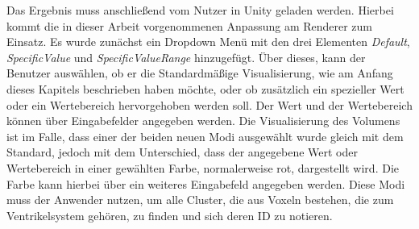 Das Ergebnis muss anschließend vom Nutzer in Unity geladen werden.
\newline
Hierbei kommt die in dieser Arbeit vorgenommenen Anpassung am Renderer zum Einsatz. Es wurde zunächst ein Dropdown Menü mit den drei Elementen \textit{Default}, \textit{SpecificValue} und \textit{SpecificValueRange} hinzugefügt. Über dieses, kann der Benutzer auswählen, ob er die Standardmäßige Visualisierung, wie am Anfang dieses Kapitels beschrieben haben möchte, oder ob zusätzlich ein spezieller Wert oder ein Wertebereich hervorgehoben werden soll. Der Wert und der Wertebereich können über Eingabefelder angegeben werden.
\newline
Die Visualisierung des Volumens ist im Falle, dass einer der beiden neuen Modi ausgewählt wurde gleich mit dem Standard, jedoch mit dem Unterschied, dass der angegebene Wert oder Wertebereich in einer gewählten Farbe, normalerweise rot, dargestellt wird. Die Farbe kann hierbei über ein weiteres Eingabefeld angegeben werden.
\newline
Diese Modi muss der Anwender nutzen, um alle Cluster, die aus Voxeln bestehen, die zum Ventrikelsystem gehören, zu finden und sich deren ID zu notieren.


